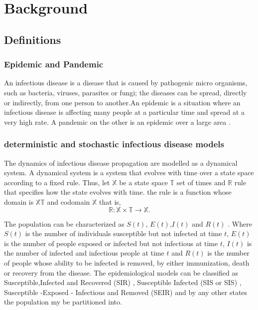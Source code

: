 \chapter{Background}

\section{Definitions}
\subsection{Epidemic and Pandemic }
An infectious disease is a disease that is caused by pathogenic micro organisms, such as bacteria, viruses, parasites or fungi; the diseases can be spread, directly or indirectly, from one person to another.An  epidemic is a situation where an infectious disease is affecting many people at a particular time and spread at a very high rate. A pandemic on the other is an epidemic over a large area \citep{morens2009pandemic}.

\subsection{deterministic and stochastic infectious disease models}
The dynamics of infectious disease propagation are modelled as a dynamical system. A dynamical system is a system that evolves with time over a state space according to a fixed rule. Thus, let $\mathbb{X}$ be a state space $\mathbb{T}$ set of times and $\mathbb{R}$ rule that specifies how the state evolves with time. the rule is a function  whose domain is $\mathbb{X} \mathbb{T}$ and codomain $\mathbb{X}$ that is,
\begin{equation*}
\mathbb{R}: \mathbb{X}  \times \mathbb{T} \longrightarrow \mathbb{X}.
\end{equation*}

The population can be characterized as $S(t)$, $E(t)$,$I(t)$ and $R(t)$ . Where $S(t)$ is the number of individuals susceptible but not infected at time $t$, $E(t)$ is the number of people exposed or infected but not infectious at time $t$, $I(t)$ is the number of infected and infectious people at time $t$ and $R(t)$ is the number of people whose  ability to be infected is removed, by either immunization, death or recovery from the disease. The epidemiological models can be classified as Susceptible,Infected and Recovered (SIR) , Susceptible Infected (SIS or SIS) , Susceptible -Exposed - Infectious and Removed (SEIR)  and by any other states the population my be partitioned into.

